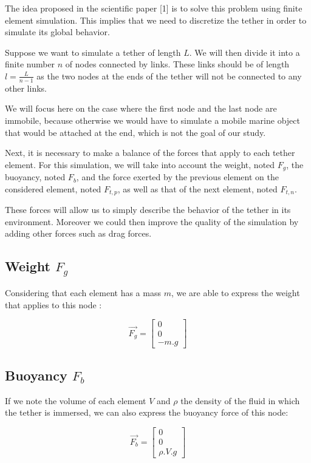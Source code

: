 The idea proposed in the scientific paper [1] is to solve this problem using finite element simulation. This implies that we need to discretize the tether in order to simulate its global behavior.

Suppose we want to simulate a tether of length $L$. We will then divide it into a finite number $n$ of nodes connected by links. These links should be of length $l=\frac{L}{n-1}$ as the two nodes at the ends of the tether will not be connected to any other links.

We will focus here on the case where the first node and the last node are immobile, because otherwise we would have to simulate a mobile marine object that would be attached at the end, which is not the goal of our study.

Next, it is necessary to make a balance of the forces that apply to each tether element. For this simulation, we will take into account the weight, noted $F_g$, the buoyancy, noted $F_b$, and the force exerted by the previous element on the considered element, noted $F_{t, p}$, as well as that of the next element, noted $F_{t, n}$.

These forces will allow us to simply describe the behavior of the tether in its environment. Moreover we could then improve the quality of the simulation by adding other forces such as drag forces.

\subsection{Weight $F_g$}
Considering that each element has a mass $m$, we are able to express the weight that applies to this node :

$$\overrightarrow{F_g} = \begin{bmatrix}0\\ 0\\ -m.g\end{bmatrix}$$

\subsection{Buoyancy $F_b$}
If we note the volume of each element $V$ and $\rho$ the density of the fluid in which the tether is immersed, we can also express the buoyancy force of this node:

$$\overrightarrow{F_b} = \begin{bmatrix}0\\ 0\\ \rho.V.g\end{bmatrix}$$

